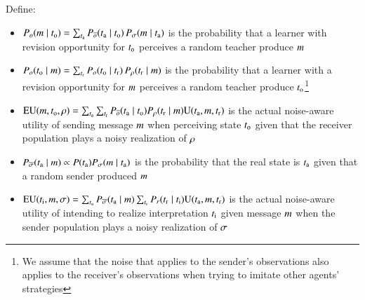\documentclass[fleqn,reqno,11pt]{article}
\begin{document}
Define:
\begin{itemize}
\item $P_o(m \mid t_{\mathrm{o}}) = \sum_{t_{\mathrm{a}}} P_{\overline{o}}(t_{\mathrm{a}}
  \mid t_{\mathrm{o}}) \thinspace P_{\sigma}(m \mid t_{\mathrm{a}})$ is the probability that
  a learner with revision opportunity for $t_{\mathrm{o}}$ perceives a random teacher produce $m$
\item $P_o(t_{\mathrm{o}} \mid m) =  \sum_{t_{\mathrm{r}}} P_o(t_{\mathrm{o}} \mid
  t_{\mathrm{r}}) \thinspace P_{\rho}(t_{\mathrm{r}} \mid m)$ is the probability that a
  learner with a revision opportunity for $m$ perceives a random teacher produce
  $t_{\mathrm{o}}$\footnote{We assume that the noise that applies to the sender's observations
    also applies to the receiver's observations when trying to imitate other agents'
    strategies}
\item $\mathrm{EU}(m , t_{\mathrm{o}}, \rho) = \sum_{t_{\mathrm{a}}} \sum_{t_{\mathrm{r}}}
  P_{\overline{o}}(t_{\mathrm{a}} \mid t_{\mathrm{o}})  P_{\rho}(t_{\mathrm{r}} \mid
  m) \mathrm{U}(t_{\mathrm{a}}, m, t_{\mathrm{r}})$ is the actual noise-aware utility of
  sending message $m$ when perceiving state $t_{\mathrm{o}}$ given that the receiver
  population plays a noisy realization of $\rho$
\item $P_{\overline{\sigma}}(t_{\mathrm{a}} \mid m) \propto P(t_{\mathrm{a}})
  P_{\sigma}(m \mid t_{\mathrm{a}})$ is the probability that the real state is
  $t_{\mathrm{a}}$ given that a random sender produced $m$
\item $\mathrm{EU}(t_{\mathrm{i}} , m, \sigma) = \sum_{t_{\mathrm{a}}}
  P_{\overline{\sigma}}(t_{\mathrm{a}} \mid m) \sum_{t_{\mathrm{r}}}
  P_{r}(t_{\mathrm{r}} \mid t_{\mathrm{i}})  \mathrm{U}(t_{\mathrm{a}}, m, t_{\mathrm{r}})$ is the actual noise-aware utility of
  intending to realize interpretation $t_{\mathrm{i}}$ given message $m$ when the sender
  population plays a noisy realization of $\sigma$
\end{itemize}
\end{document}
